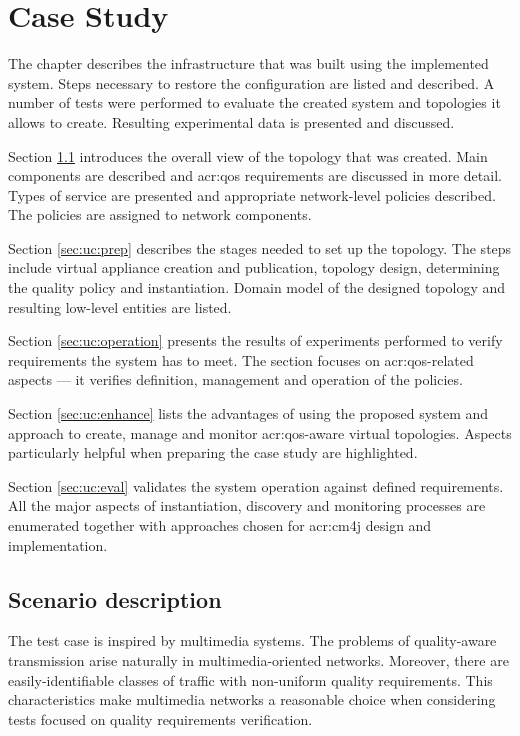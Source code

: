 \documentclass[11pt]{book}
\begin{document}
  \chapter{Case Study}
  \label{chap:cs}

    The chapter describes the infrastructure that was built using the implemented system. Steps necessary to restore the
    configuration are listed and described. A number of tests were performed to evaluate the created system and
    topologies it allows to create. Resulting experimental data is presented and discussed.

    Section \ref{sec:uc:description} introduces the overall view of the topology that was created. Main components are
    described and \gls{acr:qos} requirements are discussed in more detail. Types of service are presented and
    appropriate network-level policies described. The policies are assigned to network components.

    Section \ref{sec:uc:prep} describes the stages needed to set up the topology. The steps include virtual appliance
    creation and publication, topology design, determining the quality policy and instantiation. Domain model of the
    designed topology and resulting low-level entities are listed.

    Section \ref{sec:uc:operation} presents the results of experiments performed to verify requirements the system has
    to meet. The section focuses on \gls{acr:qos}-related aspects --- it verifies definition, management and operation
    of the policies.

    Section \ref{sec:uc:enhance} lists the advantages of using the proposed system and approach to create, manage and
    monitor \gls{acr:qos}-aware virtual topologies. Aspects particularly helpful when preparing the case study are
    highlighted.

    Section \ref{sec:uc:eval} validates the system operation against defined requirements. All the major aspects of
    instantiation, discovery and monitoring processes are enumerated together with approaches chosen for \gls{acr:cm4j}
    design and implementation.


    \section{Scenario description}
    \label{sec:uc:description}

      The test case is inspired by multimedia systems. The problems of quality-aware transmission arise naturally in
      multimedia-oriented networks. Moreover, there are easily-identifiable classes of traffic with non-uniform quality
      requirements. This characteristics make multimedia networks a reasonable choice when considering tests focused on
      quality requirements verification.
      
\end{document}

